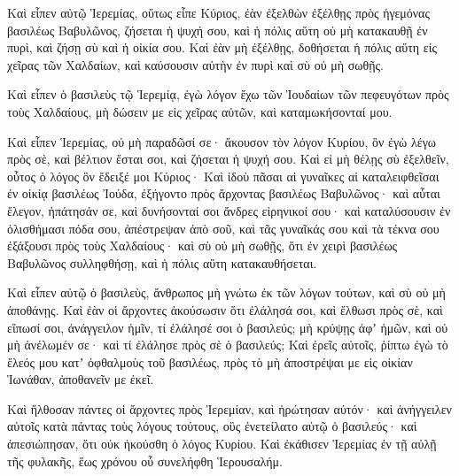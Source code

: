 {\par }{\PP {}Καὶ εἶπεν αὐτῷ Ἱερεμίας, οὕτως εἶπε Κύριος, ἐὰν ἐξελθὼν ἐξέλθῃς πρὸς ἡγεμόνας βασιλέως Βαβυλῶνος, ζήσεται ἡ ψυχή σου, καὶ ἡ πόλις αὕτη οὐ μὴ κατακαυθῇ ἐν πυρὶ, καὶ ζήσῃ σὺ καὶ ἡ οἰκία σου.
Καὶ ἐὰν μὴ ἐξέλθῃς, δοθήσεται ἡ πόλις αὕτη εἰς χεῖρας τῶν Χαλδαίων, καὶ καύσουσιν αὐτὴν ἐν πυρὶ καὶ σὺ οὐ μὴ σωθῇς.
\par }{\PP {}Καὶ εἶπεν ὁ βασιλεὺς τῷ Ἱερεμίᾳ, ἐγὼ λόγον ἔχω τῶν Ἰουδαίων τῶν πεφευγότων πρὸς τοὺς Χαλδαίους, μὴ δώσειν με εἰς χεῖρας αὐτῶν, καὶ καταμωκήσονταί μου.
\par }{\PP {}Καὶ εἶπεν Ἱερεμίας, οὐ μὴ παραδῶσί σε· ἄκουσον τὸν λόγον Κυρίου, ὃν ἐγὼ λέγω πρὸς σὲ, καὶ βέλτιον ἔσται σοι, καὶ ζήσεται ἡ ψυχή σου.
Καὶ εἰ μὴ θέλῃς σὺ ἐξελθεῖν, οὗτος ὁ λόγος ὃν ἔδειξέ μοι Κύριος·
Καὶ ἰδοὺ πᾶσαι αἱ γυναῖκες αἱ καταλειφθεῖσαι ἐν οἰκίᾳ βασιλέως Ἰούδα, ἐξήγοντο πρὸς ἄρχοντας βασιλέως Βαβυλῶνος· καὶ αὗται ἔλεγον, ἠπάτησάν σε, καὶ δυνήσονταί σοι ἄνδρες εἰρηνικοί σου· καὶ καταλύσουσιν ἐν ὀλισθήμασι πόδα σου, ἀπέστρεψαν ἀπὸ σοῦ,
καὶ τᾶς γυναῖκάς σου καὶ τὰ τέκνα σου ἐξάξουσι πρὸς τοὺς Χαλδαίους· καὶ σὺ οὐ μὴ σωθῇς, ὅτι ἐν χειρὶ βασιλέως Βαβυλῶνος συλληφθήσῃ, καὶ ἡ πόλις αὕτη κατακαυθήσεται.
\par }{\PP {}Καὶ εἶπεν αὐτῷ ὁ βασιλεὺς, ἄνθρωπος μὴ γνώτω ἐκ τῶν λόγων τούτων, καὶ σὺ οὐ μὴ ἀποθάνῃς.
Καὶ ἐὰν οἱ ἄρχοντες ἀκούσωσιν ὅτι ἐλάλησά σοι, καὶ ἔλθωσι πρὸς σὲ, καὶ εἴπωσί σοι, ἀνάγγειλον ἡμῖν, τί ἐλάλησέ σοι ὁ βασιλεύς; μὴ κρύψῃς ἀφʼ ἡμῶν, καὶ οὐ μὴ ἀνέλωμέν σε· καὶ τί ἐλάλησε πρὸς σὲ ὁ βασιλεύς;
Καὶ ἐρεῖς αὐτοῖς, ῥίπτω ἐγὼ τὸ ἔλεός μου κατʼ ὀφθαλμοὺς τοῦ βασιλέως, πρὸς τὸ μὴ ἀποστρέψαι με εἰς οἰκίαν Ἰωνάθαν, ἀποθανεῖν με ἐκεῖ.
\par }{\PP {}Καὶ ἤλθοσαν πάντες οἱ ἄρχοντες πρὸς Ἰερεμίαν, καὶ ἠρώτησαν αὐτόν· καὶ ἀνήγγειλεν αὐτοῖς κατὰ πάντας τοὺς λόγους τούτους, οὓς ἐνετείλατο αὐτῷ ὁ βασιλεύς· καὶ ἀπεσιώπησαν, ὅτι οὐκ ἠκούσθη ὁ λόγος Κυρίου.
Καὶ ἐκάθισεν Ἱερεμίας ἐν τῇ αὐλῇ τῆς φυλακῆς, ἕως χρόνου οὗ συνελήφθη Ἱερουσαλήμ.

}
